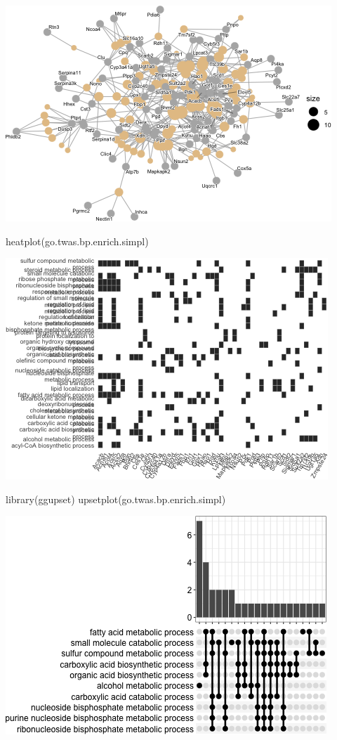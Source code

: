 \documentclass[
]{article}
\newenvironment{Shaded}{\begin{snugshade}}{\end{snugshade}}
\newcommand{\FunctionTok}[1]{\textcolor[rgb]{0.00,0.00,0.00}{#1}}
\newcommand{\NormalTok}[1]{#1}
\begin{document}
\includegraphics{figures/twas-go-4.png}

\begin{Shaded}
\begin{Highlighting}[]
\FunctionTok{heatplot}\NormalTok{(go.twas.bp.enrich.simpl)}
\end{Highlighting}
\end{Shaded}

\includegraphics{figures/twas-go-5.png}

\begin{Shaded}
\begin{Highlighting}[]
\FunctionTok{library}\NormalTok{(ggupset)}
\FunctionTok{upsetplot}\NormalTok{(go.twas.bp.enrich.simpl)}
\end{Highlighting}
\end{Shaded}

\includegraphics{figures/twas-go-6.png}
\end{document}
